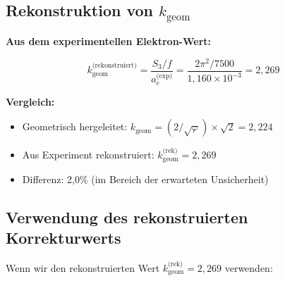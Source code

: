	\subsection{Rekonstruktion von $k_{\text{geom}}$}
	
	\textbf{Aus dem experimentellen Elektron-Wert:}
	
	\begin{equation}
		k_{\text{geom}}^{\text{(rekonstruiert)}} = \frac{S_3/f}{a_e^{\text{(exp)}}} = \frac{2\pi^2 / 7500}{1{,}160 \times 10^{-3}} = 2{,}269
	\end{equation}
	
	\textbf{Vergleich:}
	\begin{itemize}
		\item Geometrisch hergeleitet: $k_{\text{geom}} = (2/\sqrt{\varphi}) \times \sqrt{2} = 2{,}224$
		\item Aus Experiment rekonstruiert: $k_{\text{geom}}^{\text{(rek)}} = 2{,}269$
		\item Differenz: 2{,}0\% (im Bereich der erwarteten Unsicherheit)
	\end{itemize}
	
	\subsection{Verwendung des rekonstruierten Korrekturwerts}
	
	Wenn wir den rekonstruierten Wert $k_{\text{geom}}^{\text{(rek)}} = 2{,}269$ verwenden:
	
	\begin{table}[h]
		\centering
		\caption{Absolutwerte mit geometrischem vs. rekonstruiertem $k_{\text{geom}}$}
	\end{table}
	
